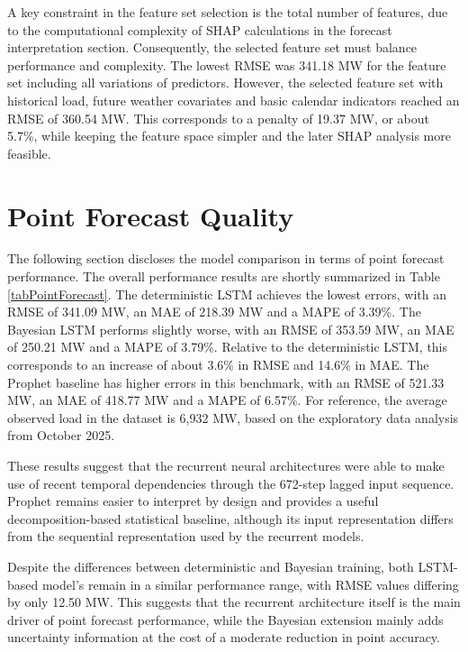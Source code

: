 \documentclass[Master,english,IEEE]{twbook}
\begin{document}
A key constraint in the feature set selection is the total number of features, due to the computational complexity of SHAP calculations in the forecast interpretation section. Consequently, the selected feature set must balance performance and complexity. The lowest RMSE was 341.18 MW for the feature set including all variations of predictors. However, the selected feature set with historical load, future weather covariates and basic calendar indicators reached an RMSE of 360.54 MW. This corresponds to a penalty of 19.37 MW, or about 5.7\%, while keeping the feature space simpler and the later SHAP analysis more feasible.


\section{Point Forecast Quality}

The following section discloses the model comparison in terms of point forecast performance. The overall performance results are shortly summarized in Table \ref{tabPointForecast}. The deterministic LSTM achieves the lowest errors, with an RMSE of 341.09 MW, an MAE of 218.39 MW and a MAPE of 3.39\%. The Bayesian LSTM performs slightly worse, with an RMSE of 353.59 MW, an MAE of 250.21 MW and a MAPE of 3.79\%. Relative to the deterministic LSTM, this corresponds to an increase of about 3.6\% in RMSE and 14.6\% in MAE. The Prophet baseline has higher errors in this benchmark, with an RMSE of 521.33 MW, an MAE of 418.77 MW and a MAPE of 6.57\%. For reference, the average observed load in the dataset is 6,932 MW, based on the exploratory data analysis from October 2025.

These results suggest that the recurrent neural architectures were able to make use of recent temporal dependencies through the 672-step lagged input sequence. Prophet remains easier to interpret by design and provides a useful decomposition-based statistical baseline, although its input representation differs from the sequential representation used by the recurrent models.


Despite the differences between deterministic and Bayesian training, both LSTM-based model's remain in a similar performance range, with RMSE values differing by only 12.50 MW. This suggests that the recurrent architecture itself is the main driver of point forecast performance, while the Bayesian extension mainly adds uncertainty information at the cost of a moderate reduction in point accuracy.
\end{document}
